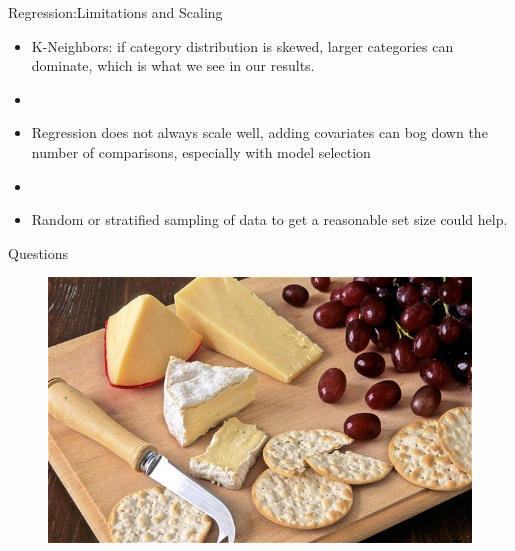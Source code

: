 \documentclass{beamer}
\begin{document}
\begin{frame}{Regression:Limitations and Scaling}
	\begin{itemize}
	\item K-Neighbors: if category distribution is skewed, larger categories can dominate, which is what we see in our results.
	\item[]
	\item Regression does not always scale well, adding covariates can bog down the number of comparisons, especially with model selection
	\item[]
	\item Random or stratified sampling of data to get a reasonable set size could help.
	\end{itemize}
\end{frame}

\begin{frame}{Questions}
	\begin{figure}
		\centering
		\includegraphics[width=\textwidth]{../images/cheese.jpg}
	\end{figure}
\end{frame}
\end{document}
